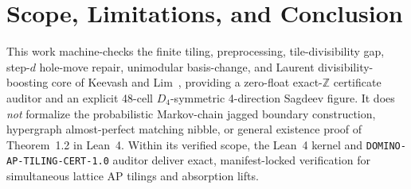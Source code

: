 \documentclass[11pt,twocolumn]{article}
\newcommand{\ZZ}{\mathbb{Z}}
\begin{document}
\section{Scope, Limitations, and Conclusion}\label{sec:conclusion}
This work machine-checks the finite tiling, preprocessing, tile-divisibility gap, step-$d$ hole-move repair, unimodular basis-change, and Laurent divisibility-boosting core of Keevash and Lim~\cite{keevash2026dominoes}, providing a zero-float exact-$\ZZ$ certificate auditor and an explicit 48-cell $D_4$-symmetric 4-direction Sagdeev figure. It does \emph{not} formalize the probabilistic Markov-chain jagged boundary construction, hypergraph almost-perfect matching nibble, or general existence proof of Theorem~1.2 in Lean~4. Within its verified scope, the Lean~4 kernel and \texttt{DOMINO-AP-TILING-CERT-1.0} auditor deliver exact, manifest-locked verification for simultaneous lattice AP tilings and absorption lifts.



\end{document}
